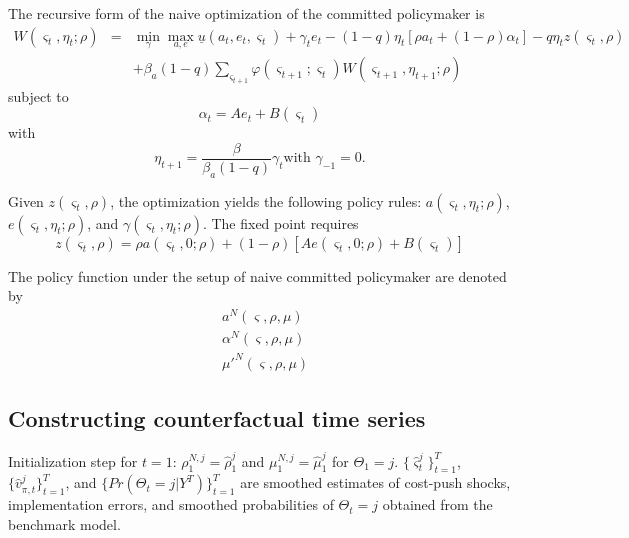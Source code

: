 \documentclass[12pt,letter,leqno]{article}
\theoremstyle{asn}
\theoremstyle{lem}
\theoremstyle{slem}
\theoremstyle{prop}
\theoremstyle{appprop}
\theoremstyle{rem}
\theoremstyle{defn}
\begin{document}
The recursive form of the naive optimization of the committed policymaker is%
\begin{eqnarray*}
W\left( \varsigma _{t},\eta _{t};\rho \right)  &=&\min_{\gamma }\max_{a,e}%
\underline{u}(a_{t},e_{t},\varsigma _{t})+\gamma _{t}e_{t}-\left( 1-q\right)
\eta _{t}\left[ \rho a_{t}+\left( 1-\rho \right) \alpha _{t}\right] -q\eta
_{t}z\left( \varsigma _{t},\rho \right)  \\
&&+\beta _{a}\left( 1-q\right) \sum_{\varsigma _{t+1}}\varphi \left(
\varsigma _{t+1};\varsigma _{t}\right) W\left( \varsigma _{t+1},\eta
_{t+1};\rho \right) 
\end{eqnarray*}%
subject to%
\[
\alpha _{t}=Ae_{t}+B\left( \varsigma _{t}\right) 
\]%
with%
\[
\eta _{t+1}=\frac{\beta }{\beta _{a}\left( 1-q\right) }\gamma _{t}\text{
with }\gamma _{-1}=0.
\]

\bigskip 

Given $z\left( \varsigma _{t},\rho \right) $, the optimization yields the
following policy rules: $a\left( \varsigma _{t},\eta _{t};\rho \right)$, $e\left( \varsigma _{t},\eta _{t};\rho \right)$, and $\gamma\left( \varsigma _{t},\eta _{t};\rho \right)$. The fixed point requires
\[
z\left( \varsigma _{t},\rho \right) =\rho a\left( \varsigma _{t},0;\rho
\right) +\left( 1-\rho \right) \left[ Ae\left( \varsigma _{t},0;\rho \right)
+B\left( \varsigma _{t}\right) \right] 
\]


The policy function under the setup of naive committed policymaker are denoted by
\begin{align*}
& a^N(\varsigma,\rho,\mu) \\
& \alpha^N(\varsigma,\rho,\mu) \\
& \mu'^N(\varsigma,\rho,\mu)
\end{align*}


\subsection{Constructing counterfactual time series}
Initialization step for $t=1$: $\rho_1^{N,j}=\hat{\rho}_1^j$ and $\mu_1^{N,j}=\hat{\mu}_1^j$ for $\Theta_1=j$. $\{\hat{\varsigma}^j_t\}_{t=1}^T$, $\{\hat{v}_{\pi,t}^j\}_{t=1}^T$, and $\{Pr(\Theta_t=j|Y^T)\}_{t=1}^T$ are smoothed estimates of cost-push shocks, implementation errors, and smoothed probabilities of $\Theta_t=j$ obtained from the benchmark model. 
\end{document}
